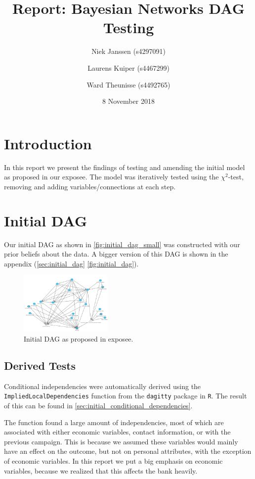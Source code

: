 \documentclass[11pt]{article}
\title{Report: Bayesian Networks DAG Testing}
\date{8 November 2018}
\author{Niek Janssen (s4297091)\and Laurens Kuiper (s4467299)\and Ward Theunisse (s4492765)}
\begin{document}
\maketitle
\thispagestyle{empty}
\begin{multicols}{2}
\section{Introduction}
In this report we present the findings of testing and amending the initial model
as proposed in our exposee.  The model was iteratively tested using the
$\chi^2$-test, removing and adding variables/connections at each step.

\section{Initial DAG}
Our initial DAG as shown in \autoref{fig:initial_dag_small} was constructed
with our prior beliefs about the data. A bigger version of this DAG is shown
in the appendix (\autoref{sec:initial_dag} \autoref{fig:initial_dag}). 

\begin{figure}[H]
	\centering
	\includegraphics[width=0.4\textwidth]{images/initial_dag}
	\caption{Initial DAG as proposed in exposee.}
	\label{fig:initial_dag_small}
\end{figure}

\subsection{Derived Tests}
Conditional independencies were automatically derived using the
\texttt{ImpliedLocalDependencies} function from the \texttt{dagitty} package in
\texttt{R}. The result of this can be found in 
\autoref{sec:initial_conditional_dependencies}.

The function found a large amount of independencies, most of which are associated with either economic variables, contact information, or with the previous campaign. This is because we assumed these variables would mainly have an effect on the outcome, but not on personal attributes, with the exception of economic variables. In this report we put a big emphasis on economic variables, because we realized that this affects the bank heavily.


\end{multicols}
\end{document}
